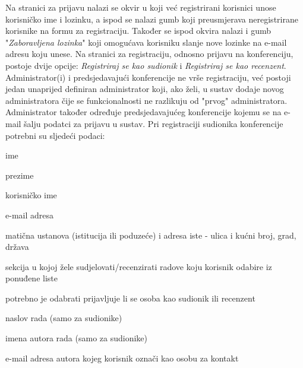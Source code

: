 		\newline
		Na stranici za prijavu nalazi se okvir u koji već registrirani korisnici unose korisničko ime i lozinku, a ispod se nalazi gumb koji preusmjerava neregistrirane korisnike na formu za registraciju. Također se ispod okvira nalazi i gumb "\textit{Zaboravljena lozinka}" koji omogućava korisniku slanje nove lozinke na e-mail adresu koju unese. Na stranici za registraciju, odnosno prijavu na konferenciju, postoje dvije opcije: \textit{Registriraj se kao sudionik} i \textit{Registriraj se kao recenzent}. Administrator(i) i predsjedavajući konferencije ne vrše registraciju, već postoji jedan unaprijed definiran administrator koji, ako želi, u sustav dodaje novog administratora čije se funkcionalnosti ne razlikuju od "prvog" administratora. Administrator također određuje predsjedavajućeg konferencije kojemu se na e-mail šalju podatci za prijavu u sustav.
		\newline
		\newline
		Pri registraciji sudionika konferencije potrebni su sljedeći podaci:

		\begin{packed_item}

			\item ime
			\item prezime
			\item korisničko ime
			\item e-mail adresa
			\item matična ustanova (istitucija ili poduzeće) i adresa iste - ulica i kućni broj, grad, država
			\item sekcija u kojoj žele sudjelovati/recenzirati radove koju korisnik odabire iz ponuđene liste
			\item potrebno je odabrati prijavljuje li se osoba kao sudionik ili recenzent
			\item naslov rada (samo za sudionike)
			\item imena autora rada (samo za sudionike)
			\item e-mail adresa autora kojeg korisnik označi kao osobu za kontakt
		
		\end{packed_item}
	
